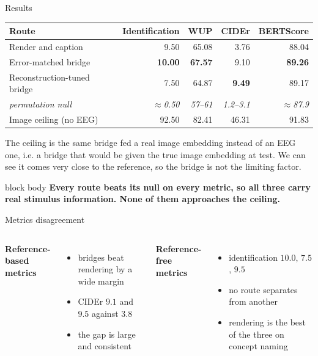 \documentclass[aspectratio=169,10pt]{beamer}
\newcommand{\takeaway}[1]{%
  \vspace{0.3em}\begin{beamercolorbox}[rounded=true,sep=0.55em]{block body}
  \textbf{#1}
  \end{beamercolorbox}}
\begin{document}
\begin{frame}{Results}
  \vspace{4pt}
  \begin{center}
  \small
  \begin{tabular}{@{}lrrrr@{}}
    \toprule
    Route & Identification & WUP & CIDEr & BERTScore \\
    \midrule
    Render and caption          & 9.50 & 65.08 & 3.76 & 88.04 \\
    Error-matched bridge        & \textbf{10.00} & \textbf{67.57} & 9.10 & \textbf{89.26} \\
    Reconstruction-tuned bridge & 7.50 & 64.87 & \textbf{9.49} & 89.17 \\
    \midrule
    \textit{permutation null}   & \textit{$\approx$0.50} & \textit{57--61} & \textit{1.2--3.1} & \textit{$\approx$87.9} \\
    \midrule
    Image ceiling (no EEG)      & 92.50 & 82.41 & 46.31 & 91.83 \\
    \bottomrule
  \end{tabular}
  \end{center}

  \vspace{0.5em}
  \small The ceiling is the same bridge fed a real image embedding instead of an EEG one, i.e. a bridge that would be given the true image embedding at test.
  We can see it comes very close to the reference, so the bridge is not the limiting factor. 
  \takeaway{Every route beats its null on every metric, so all three carry real stimulus
  information. None of them approaches the ceiling.}
\end{frame}

\begin{frame}{Metrics disagreement}
  \small
  \begin{columns}[T,onlytextwidth]
      \textbf{Reference-based metrics}
      \begin{itemize}
        \item bridges beat rendering by a wide margin
        \item CIDEr $9.1$ and $9.5$ against $3.8$
        \item the gap is large and consistent
      \end{itemize}

      \textbf{Reference-free metrics}
      \begin{itemize}
        \item identification $10.0$, $7.5$, $9.5$
        \item no route separates from another
        \item rendering is the best of the three on
              concept naming
      \end{itemize}
  \end{columns}
\end{frame}
\end{document}
